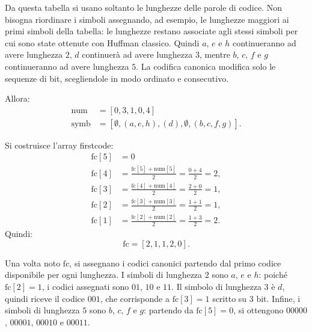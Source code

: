 \documentclass{article}
\theoremstyle{definition}
\numberwithin{equation}{section}
\begin{document}
Da questa tabella si usano soltanto le lunghezze delle parole di codice. Non bisogna riordinare i simboli assegnando, ad esempio, le lunghezze maggiori ai primi simboli della tabella: le lunghezze restano associate agli stessi simboli per cui sono state ottenute con Huffman classico. Quindi $a$, $e$ e $h$ continueranno ad avere lunghezza $2$, $d$ continuerà ad avere lunghezza $3$, mentre $b$, $c$, $f$ e $g$ continueranno ad avere lunghezza $5$. La codifica canonica modifica solo le sequenze di bit, scegliendole in modo ordinato e consecutivo.

Allora:
\begin{align*}
    \text{num}  & =[0        , 3      , 1  , 0        , 4        ]  \\
    \text{symb} & =[\emptyset, (a,e,h), (d), \emptyset, (b,c,f,g)].
\end{align*}

Si costruisce l'array firstcode:
\begin{align*}
    \text{fc}[5] & =0                                     \\
    \text{fc}[4] & = \frac{\text{fc}[5]+\text{num}[5]}{2}
    = \frac{0+4}{2}=2,                                    \\
    \text{fc}[3] & = \frac{\text{fc}[4]+\text{num}[4]}{2}
    = \frac{2+0}{2}=1,                                    \\
    \text{fc}[2] & = \frac{\text{fc}[3]+\text{num}[3]}{2}
    = \frac{1+1}{2}=1,                                    \\
    \text{fc}[1] & = \frac{\text{fc}[2]+\text{num}[2]}{2}
    = \frac{1+3}{2}=2.
\end{align*}
Quindi:
\[
    \text{fc}=[2,1,1,2,0].
\]

Una volta noto $\text{fc}$, si assegnano i codici canonici partendo dal primo codice disponibile per ogni lunghezza. I simboli di lunghezza $2$ sono $a$, $e$ e $h$: poiché $\text{fc}[2]=1$, i codici assegnati sono $01$, $10$ e $11$. Il simbolo di lunghezza $3$ è $d$, quindi riceve il codice $001$, che corrisponde a $\text{fc}[3]=1$ scritto su $3$ bit. Infine, i simboli di lunghezza $5$ sono $b$, $c$, $f$ e $g$: partendo da $\text{fc}[5]=0$, si ottengono $00000$, $00001$, $00010$ e $00011$.
\end{document}
